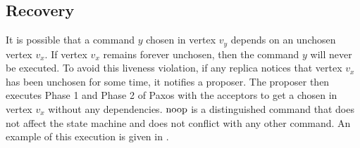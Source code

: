 \subsection{Recovery}
{}

%
It is possible that a command $y$ chosen in vertex $v_y$ depends on an unchosen
vertex $v_x$. If vertex $v_x$ remains forever unchosen, then the command $y$
will never be executed. To avoid this liveness violation, if any replica
notices that vertex $v_x$ has been unchosen for some time, it notifies a
proposer. The proposer then executes Phase 1 and Phase 2 of Paxos with the
acceptors to get a  chosen in vertex $v_x$ without any
dependencies. $\text{noop}$ is a distinguished command that does not affect the state
machine and does not conflict with any other command. An example of this
execution is given in .


